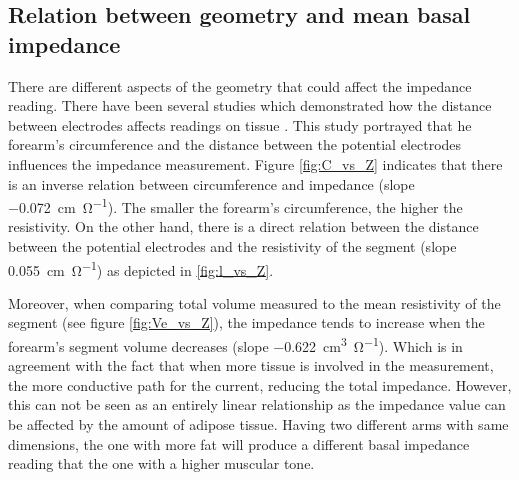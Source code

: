 \subsection{Relation between geometry and mean basal impedance}
\label{senction basal 2}
There are different aspects of the geometry that could affect the impedance reading. There have been several studies which demonstrated how the distance between electrodes affects readings on tissue \cite{kun2000effects, yamamoto1992impedance}. This study portrayed that he forearm's circumference and the distance between the potential electrodes influences the impedance measurement. Figure \ref{fig:C_vs_Z} indicates that there is an inverse relation between circumference and impedance (slope \SI{-0.072}{\centi\meter\per\ohm}). The smaller the forearm's circumference, the higher the resistivity. On the other hand, there is a direct relation between the distance between the potential electrodes and the resistivity of the segment (slope \SI{0.055}{\centi\meter\per\ohm}) as depicted in \ref{fig:l_vs_Z}.

Moreover, when comparing total volume measured to the mean resistivity of the segment (see figure \ref{fig:Ve_vs_Z}), the impedance tends to increase when the forearm's segment volume decreases (slope \SI{-0.622}{\cubic\centi\metre\per\ohm}). Which is in agreement with the fact that when more tissue is involved in the measurement, the more conductive path for the current, reducing the total impedance. However, this can not be seen as an entirely linear relationship as the impedance value can be affected by the amount of adipose tissue. Having two different arms with same dimensions, the one with more fat will produce a different basal impedance reading that the one with a higher muscular tone. 

